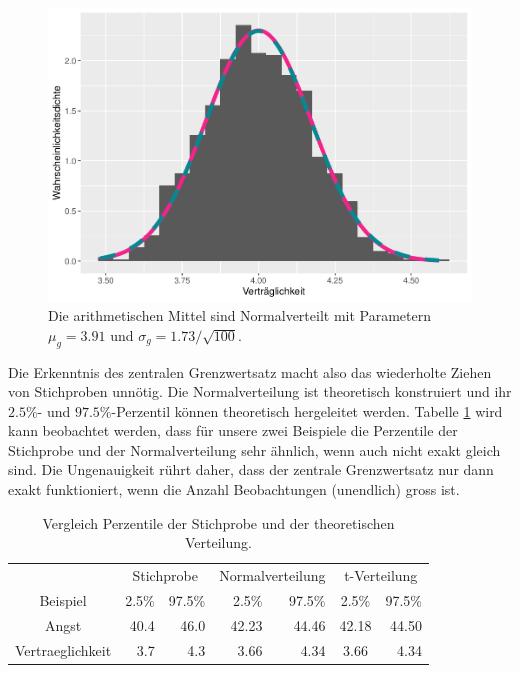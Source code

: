 \documentclass[
]{book}
\theoremstyle{definition}
\theoremstyle{definition}
\theoremstyle{definition}
\theoremstyle{definition}
\theoremstyle{remark}
\begin{document}
\begin{figure}
\centering
\includegraphics{aps_statistik1_files/figure-latex/exm-agreableness-normal-approx-1.pdf}
\caption{\label{fig:exm-agreableness-normal-approx}Die arithmetischen Mittel sind Normalverteilt mit Parametern \(\mu_g = 3.91\) und \(\sigma_g = 1.73 / \sqrt{100}\).}
\end{figure}

Die Erkenntnis des zentralen Grenzwertsatz macht also das wiederholte Ziehen von Stichproben unnötig. Die Normalverteilung ist theoretisch konstruiert und ihr \(2.5\%\)- und \(97.5\%\)-Perzentil können theoretisch hergeleitet werden. Tabelle \ref{tab:quantiles-norm} wird kann beobachtet werden, dass für unsere zwei Beispiele die Perzentile der Stichprobe und der Normalverteilung sehr ähnlich, wenn auch nicht exakt gleich sind. Die Ungenauigkeit rührt daher, dass der zentrale Grenzwertsatz nur dann exakt funktioniert, wenn die Anzahl Beobachtungen (unendlich) gross ist.

\begin{table}
\centering
\caption{\label{tab:quantiles-norm}Vergleich Perzentile der Stichprobe und der theoretischen Verteilung.}
\centering
\begin{tabular}[t]{crrrrcr}
\toprule
\multicolumn{1}{c}{ } & \multicolumn{2}{c}{Stichprobe} & \multicolumn{2}{c}{Normalverteilung} & \multicolumn{2}{c}{t-Verteilung} \\
\cmidrule(l{3pt}r{3pt}){2-3} \cmidrule(l{3pt}r{3pt}){4-5} \cmidrule(l{3pt}r{3pt}){6-7}
Beispiel & 2.5\% & 97.5\% & 2.5\% & 97.5\% & 2.5\% & 97.5\%\\
\midrule
Angst & 40.4 & 46.0 & 42.23 & 44.46 & 42.18 & 44.50\\
Vertraeglichkeit & 3.7 & 4.3 & 3.66 & 4.34 & 3.66 & 4.34\\
\bottomrule
\end{tabular}
\end{table}
\end{document}
